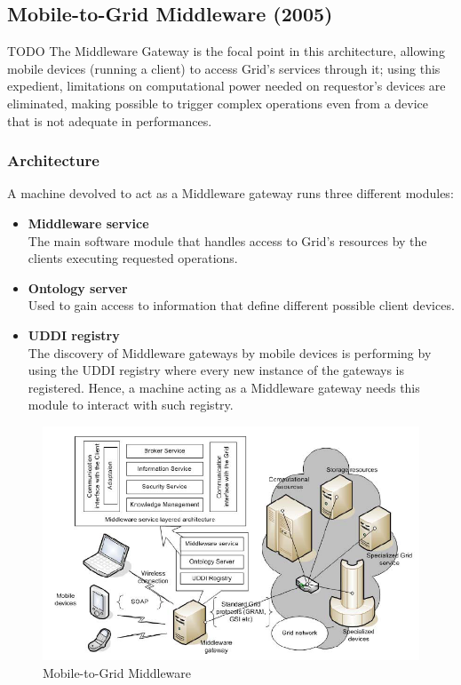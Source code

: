 \subsection{Mobile-to-Grid Middleware (2005)}
TODO
The Middleware Gateway is the focal point in this architecture, allowing mobile devices (running a client) to access Grid's services through it; using this expedient, limitations on computational power needed on requestor's devices are eliminated, making possible to trigger complex operations even from a device that is not adequate in performances.

\subsubsection{Architecture}
A machine devolved to act as a Middleware gateway runs three different modules:
\begin{itemize}
    \item \textbf{Middleware service}\\
    The main software module that handles access to Grid's resources by the clients executing requested operations.
    \item \textbf{Ontology server}\\
    Used to gain access to information that define different possible client devices.
    \item \textbf{UDDI registry}\\
    The discovery of Middleware gateways by mobile devices is performing by using the UDDI registry where every new instance of the gateways is registered. Hence, a machine acting as a Middleware gateway needs this module to interact with such registry.
\end{itemize}

\begin{figure}[H]
    \centering
    \includegraphics[scale=0.75]{document/chapters/chapter_3/images/2005_architecture.png}
    \caption{Mobile-to-Grid Middleware \cite{mobile_to_grid_middleware}}
    \label{fig:2005_architecture}
\end{figure}

